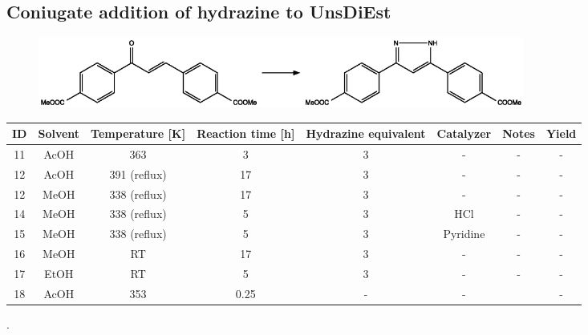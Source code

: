 \documentclass[../Master.tex]{subfiles}
\begin{document}
\begin{landscape}
	\section{Coniugate addition of hydrazine to UnsDiEst}
	\begin{figure}[h!]
		\centering
		\includegraphics[width=16cm,keepaspectratio]{Structures/pyrazole-formation-appendix2.eps}
	\end{figure}
	\vspace{0.5cm}
	\begin{table}[h]
		\setlength{\tabcolsep}{10pt}     %
		\centering
		\begin{tabular}{cccccccc}
			\toprule
			\bf ID & \bf Solvent & \bf Temperature [K] & \bf Reaction time [h] & \bf Hydrazine equivalent & \bf Catalyzer & \bf Notes       & \bf Yield \\
			\midrule
			11     & AcOH        & 363                 & 3                     & 3                        & -             & -               & -         \\
			12     & AcOH        & 391 (reflux)        & 17                    & 3                        & -             & -               & -         \\
			12     & MeOH        & 338 (reflux)        & 17                    & 3                        & -             & -               & -         \\
			14     & MeOH        & 338 (reflux)        & 5                     & 3                        & HCl           & -               & -         \\
			15     & MeOH        & 338 (reflux)        & 5                     & 3                        & Pyridine      & -               & -         \\
			16     & MeOH        & RT                  & 17                    & 3                        & -             & -               & -         \\
			17     & EtOH        & RT                  & 5                     & 3                        & -             & -               & -         \\
			18     & AcOH        & 353                 & 0.25                  & -                        & -             & \footnotemark{} & -         \\
			\bottomrule
		\end{tabular}
	\end{table}
	.
	\endgroup
	\thispagestyle{empty}
	\vspace*{\fill}

\end{landscape}
\thispagestyle{empty}
\end{document}
